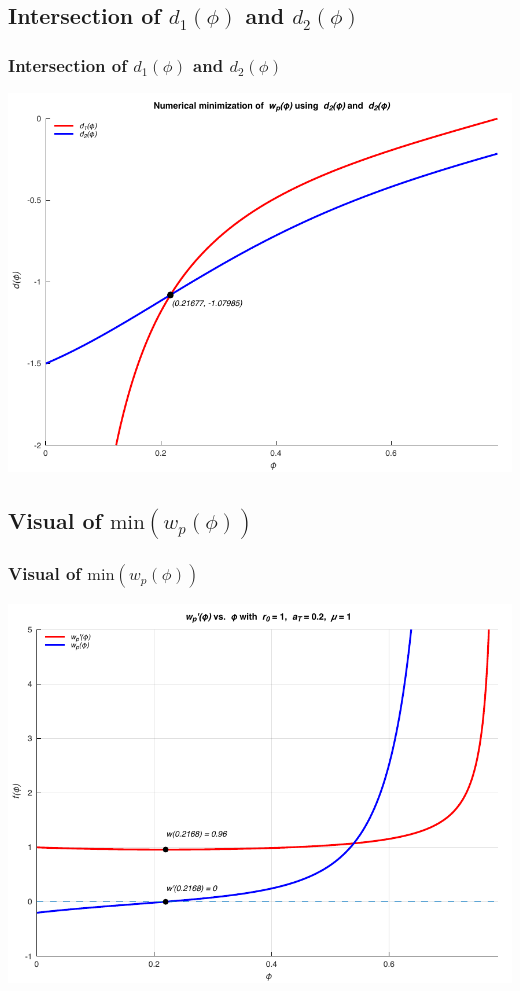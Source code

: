 \documentclass{beamer}
\newcommand{\sectit}[1]{
    \section{\texorpdfstring{#1}{}}
    \frametitle{\texorpdfstring{#1}{}}
}
\begin{document}
\begin{frame}
    \sectit{Intersection of $d_1(\phi)$ and $d_2(\phi)$}

    \begin{center}
        \includegraphics[scale=0.7]{../plots/partC_min.pdf}
    \end{center}
\end{frame}

\begin{frame}
    \sectit{Visual of $\text{min}(w_p(\phi))$}

    \begin{center}
        \includegraphics[scale=0.7]{../plots/partC_r.pdf}
    \end{center}
\end{frame}
\end{document}
